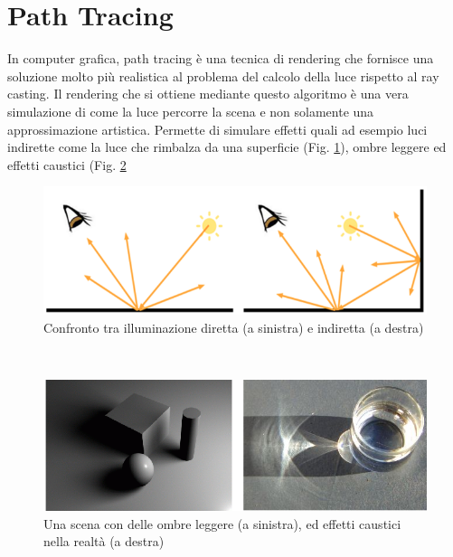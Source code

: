 \section{Path Tracing}
\label{sec:chapter_stato_arte_path_tracing}

In computer grafica, path tracing è una tecnica di rendering che fornisce una soluzione molto più realistica al problema del calcolo della luce rispetto al ray casting.
Il rendering che si ottiene mediante questo algoritmo è una vera simulazione di come la luce percorre la scena e non solamente una approssimazione artistica. Permette di simulare effetti quali ad esempio luci indirette come la luce che rimbalza da una superficie (Fig. \ref{fig:stato_arte_luci_dir_ind}), ombre leggere ed effetti caustici (Fig. \ref{fig:stato_arte_ombre_caust} 
\\
\begin{figure}[htb]
 \centering
 \includegraphics[width=0.8\linewidth]{images/chapter_stato_arte/stato_arte_luci_dir_ind.png}\hfill
 \caption[Illuminazione diretta e indiretta]{Confronto tra illuminazione diretta (a sinistra) e indiretta (a destra)}
 \label{fig:stato_arte_luci_dir_ind}
\end{figure}
\\
\begin{figure}[htb]
 \centering
 \includegraphics[width=0.8\linewidth]{images/chapter_stato_arte/stato_arte_ombre_caust.png}\hfill
 \caption[Ombreggiature ed effetti caustici]{Una scena con delle ombre leggere (a sinistra), ed effetti caustici nella realtà (a destra)}
 \label{fig:stato_arte_ombre_caust}
\end{figure}

